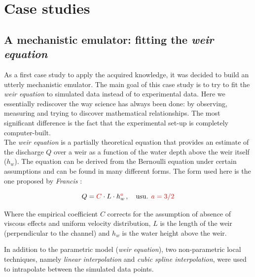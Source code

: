 \chapter{Case studies}
\label{chp:case_studies}

\section{A mechanistic emulator: fitting the \emph{weir equation}}
\label{sec:mechanistic_emulator}

As a first case study to apply the acquired knowledge, it was decided to build an utterly mechanistic emulator.
The main goal of this case study is to try to fit the \emph{weir equation} to simulated data instead of to experimental data.
Here we essentially rediscover the way science has always been done: by observing, measuring and trying to discover mathematical relationships.
The most significant difference is the fact that the experimental set-up is completely computer-built.\\

The \emph{weir equation} is a partially theoretical equation that provides an estimate of the discharge $Q$ over a weir as a function of the water depth above the weir itself ($h_w$).
The equation can be derived from the Bernoulli equation under certain assumptions \autocite{bos_discharge_1989} and can be found in many different forms.
The form used here is the one proposed by \emph{Francis} \autocite{walcott_weir_1907}:

\begin{equation}\label{eq:weir_eq}
  Q = \textcolor{red}{C} \cdot L \cdot h_w^{\textcolor{red}{a}}\, , \quad \mbox{usu. } \textcolor{red}{a = 3/2}
\end{equation}

\noindent Where the empirical coefficient $C$ corrects for the assumption of absence of viscous effects and uniform velocity distribution, $L$ is the length of the weir (perpendicular to the channel) and $h_w$ is the water height above the weir.

In addition to the parametric model (\textit{weir equation}), two non-parametric local techniques, namely \emph{linear interpolation} and \emph{cubic spline interpolation}, were used to intrapolate between the simulated data points.\\


